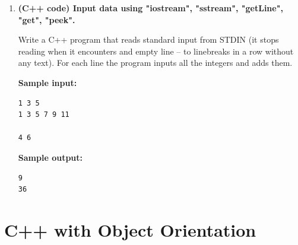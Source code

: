 \documentclass[a4paper,12pt]{article}
\begin{document}
\begin{enumerate}[label=1.\Alph*.]
\item {\bf (C++ code) Input data using "iostream", "sstream", "getLine", "get", "peek".}

Write a C++ program that reads standard input from STDIN
(it stops reading when it encounters and empty line -- to linebreaks in a row without any text). 
For each line the program inputs all the integers and adds them. 

{\bf Sample input:}

\begin{verbatim}
1 3 5
1 3 5 7 9 11

4 6
\end{verbatim}

{\bf Sample output:}

\begin{verbatim}
9
36
\end{verbatim}



\end{enumerate}



\section{C++ with Object Orientation}
\end{document}
